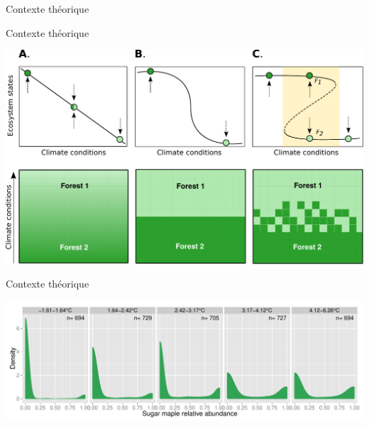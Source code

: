 \documentclass{eecslides}
\begin{document}
	\begin{frame}{Contexte théorique}
		\begin{center}
		\end{center}
	\end{frame}


	\begin{frame}{Contexte théorique}
		\begin{center}
		\includegraphics[height=0.6\textheight]{states}\\
		\end{center}
	\end{frame}


	\begin{frame}{Contexte théorique}
		\begin{center}
		\includegraphics[height=0.6\textheight]{ass_ers}\\
		\end{center}
	\end{frame}

\end{document}
